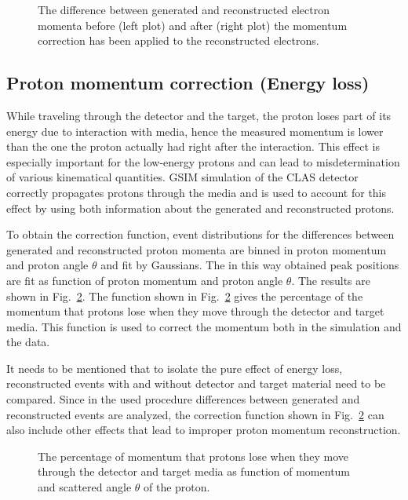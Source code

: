 \begin{figure}[htp]
\begin{center}
\caption{\small The difference between generated and reconstructed electron momenta before (left plot) and after (right plot) the momentum correction has been applied to the reconstructed electrons. \label{fig:el_mom_corr_sim}} 
\end{center}
\end{figure}

\subsection{Proton momentum correction (Energy loss)}
\label{protonmomcor}

While traveling through the detector and the target, the proton loses part of its energy due to interaction with media, hence the measured momentum is lower than the one the proton actually had right after the interaction. This effect is especially important for the low-energy protons and can lead to misdetermination of various kinematical quantities. GSIM simulation of the CLAS detector  correctly propagates protons through the media and is used to account for this effect by using both information about the generated and reconstructed protons. 

To obtain the correction function, event distributions for the differences between generated
and reconstructed proton momenta are binned in proton momentum and proton angle $\theta$ and fit by Gaussians. The in this way obtained peak positions are fit as function of proton momentum and proton angle $\theta$.
The results are shown in Fig.~\ref{fig:eloss}. The function shown in Fig.~\ref{fig:eloss} gives the percentage of  the momentum that protons lose when they move through the detector and target media.
This function is used to correct the momentum both in the simulation and the data.

It needs to be mentioned that to isolate the pure effect of energy loss, reconstructed events with and without detector and target material need to be compared. Since in the used procedure differences between generated and reconstructed events are analyzed, the correction function shown in Fig.~\ref{fig:eloss} can also include other effects that lead to improper proton momentum reconstruction.

\begin{figure}[htp]
\begin{center}
\caption{\small The percentage of momentum that protons lose when they move through the detector and target media as function of momentum and scattered angle $\theta$ of the proton. \label{fig:eloss}} 
\end{center}
\end{figure}
